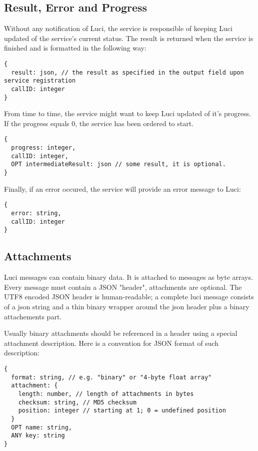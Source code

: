 \subsection{Result, Error and Progress}
Without any notification of Luci, the service is responsible of keeping Luci updated of the service's current status. The result is returned when the service is finished and is formatted in the following way:

\begin{lstlisting}
{
  result: json, // the result as specified in the output field upon service registration
  callID: integer
}
\end{lstlisting}

From time to time, the service might want to keep Luci updated of it's progress. If the progress equals 0, the service has been ordered to start.
\begin{lstlisting}
{
  progress: integer,
  callID: integer,
  OPT intermediateResult: json // some result, it is optional.
}
\end{lstlisting}

Finally, if an error occured, the service will provide an error message to Luci:
\begin{lstlisting}
{
  error: string,
  callID: integer
}
\end{lstlisting}

\subsection{Attachments}

Luci messages can contain binary data. It is attached to messages as byte arrays. Every message must contain a JSON "header", attachments are optional. The UTF8 encoded JSON header is human-readable; a complete luci message consists of a json string and a thin binary wrapper around the json header plus a binary attachements part.

Usually binary attachments should be referenced in a header using a special attachment description. Here is a convention for JSON format of such description:

\begin{lstlisting}
{
  format: string, // e.g. "binary" or "4-byte float array"
  attachment: {
    length: number, // length of attachments in bytes
    checksum: string, // MD5 checksum
    position: integer // starting at 1; 0 = undefined position
  }
  OPT name: string,
  ANY key: string
}
\end{lstlisting}

